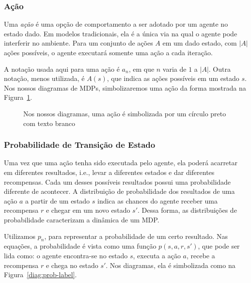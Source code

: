 \documentclass{article}
\begin{document}
            \subsubsection{Ação}
            
                Uma \emph{ação} é uma opção de comportamento a ser adotado por um agente no estado dado. Em modelos tradicionais, ela é a única via na qual o agente pode interferir no ambiente. Para um conjunto de ações $A$ em um dado estado, com $\vert A \vert$ ações possíveis, o agente executará somente uma ação a cada iteração.

                A notação usada aqui para uma ação é $a_n$, em que $n$ varia de $1$ a $\vert A \vert$. Outra notação, menos utilizada, é $A(s)$, que indica as ações possíveis em um estado $s$. Nos nossos diagramas de MDPs, simbolizaremos uma ação da forma mostrada na Figura~\ref{diag:action-node}.

                \begin{figure}[ht]
                    \centering
                    \caption{Nos nossos diagramas, uma ação é simbolizada por um círculo preto com texto branco}
                    \label{diag:action-node}
                \end{figure}
                
            \subsubsection{Probabilidade de Transição de Estado}

                Uma vez que uma ação tenha sido executada pelo agente, ela poderá acarretar em diferentes resultados, i.e., levar a diferentes estados e dar diferentes recompensas. Cada um desses possíveis resultados possui uma probabilidade diferente de acontecer. A distribuição de probabilidade dos resultados de uma ação $a$ a partir de um estado $s$ indica as chances do agente receber uma recompensa $r$ e chegar em um novo estado $s'$. Dessa forma, as distribuições de probabilidade caracterizam a dinâmica de um MDP.

                Utilizamos $p_n$, para representar a probabilidade de um certo resultado. Nas equações, a probabilidade é vista como uma função $p(s, a, r, s')$, que pode ser lida como: o agente encontra-se no estado $s$, executa a ação $a$, recebe a recompensa $r$ e chega no estado $s'$. Nos diagramas, ela é simbolizada como na Figura~\ref{diag:prob-label}.
\end{document}
